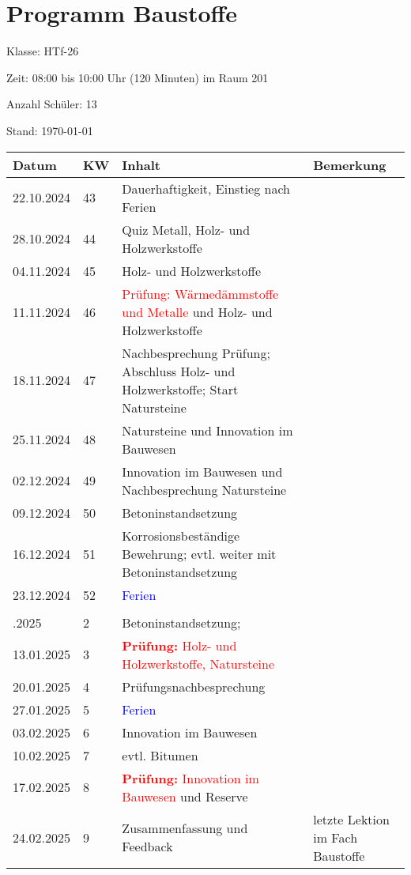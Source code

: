 \documentclass[
11pt,
captions=tableheading,
headings=big,
headsepline,
footsepline, 
captions=tableheading,
parskip=half-,
]{scrartcl}
\title{\fach}
\date{2024}
\newcommand{\klasse}{HTf-26\xspace}
\newcommand{\red}[1]{\textcolor{red}{#1}}
\begin{document}
\section*{Programm Baustoffe}

Klasse: \klasse

Zeit: 08:00 bis 10:00 Uhr (120 Minuten) im Raum 201

Anzahl Schüler: 13



Stand: \today

\vspace{0.75cm}



\begin{table}[H]
    \centering
    \begin{tabular}{llp{8.5cm}p{3.5cm}}
    \toprule
    Datum & KW  & Inhalt & Bemerkung \\
    \midrule
        22.10.2024 & 43 & Dauerhaftigkeit, Einstieg nach Ferien & {} \\
        28.10.2024 & 44 & Quiz Metall, Holz- und Holzwerkstoffe& {} \\
        04.11.2024 & 45 & Holz- und Holzwerkstoffe & {} \\
        11.11.2024 & 46 & \red{Prüfung: Wärmedämmstoffe und Metalle} und Holz- und Holzwerkstoffe & {} \\
        18.11.2024 & 47 & Nachbesprechung Prüfung; Abschluss Holz- und Holzwerkstoffe; Start Natursteine& {} \\
        25.11.2024 & 48 & Natursteine  und Innovation im Bauwesen & {} \\
        02.12.2024 & 49 & Innovation im Bauwesen und Nachbesprechung Natursteine& {} \\
        09.12.2024 & 50 & Betoninstandsetzung & {} \\
        16.12.2024 & 51 & Korrosionsbeständige Bewehrung; evtl. weiter mit Betoninstandsetzung & {} \\
        23.12.2024 & 52 & \textcolor{blue}{Ferien} & {} \\
        \midrule
        \\ \addlinespace
        \midrule
        06.01.2025 & 2 & Betoninstandsetzung;  & {} \\
        13.01.2025 & 3 &  \red{\textbf{Prüfung:} Holz- und Holzwerkstoffe, Natursteine}  & {} \\
        20.01.2025 & 4 & Prüfungsnachbesprechung & {} \\
        \hline
        27.01.2025 & 5 & \textcolor{blue}{Ferien} & {} \\
        \hline
        03.02.2025 & 6 & Innovation im Bauwesen & {} \\
        10.02.2025 & 7 & evtl. Bitumen & {} \\
        17.02.2025 & 8 & \red{\textbf{Prüfung:} Innovation im Bauwesen} und Reserve & {} \\
        24.02.2025 & 9 & Zusammenfassung und Feedback & letzte Lektion im Fach Baustoffe\\
    \bottomrule
    \end{tabular}
\end{table}
\end{document}
